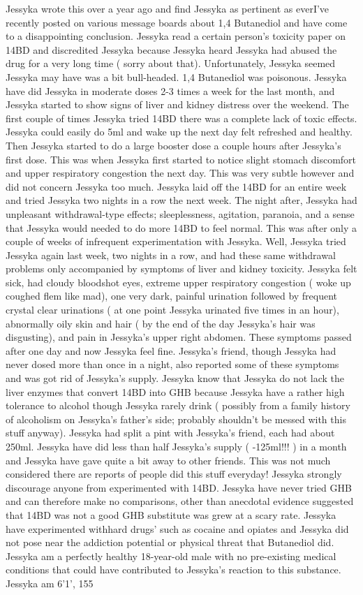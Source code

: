 \documentclass[12pt]{book}
\begin{document}
Jessyka wrote this over a year ago and find Jessyka as pertinent as everI've recently posted on various message boards about 1,4 Butanediol and have come to a disappointing conclusion. Jessyka read a certain person's toxicity paper on 14BD and discredited Jessyka because Jessyka heard Jessyka had abused the drug for a very long time ( sorry about that). Unfortunately, Jessyka seemed Jessyka may have was a bit bull-headed. 1,4 Butanediol was poisonous. Jessyka have did Jessyka in moderate doses 2-3 times a week for the last month, and Jessyka started to show signs of liver and kidney distress over the weekend. The first couple of times Jessyka tried 14BD there was a complete lack of toxic effects. Jessyka could easily do 5ml and wake up the next day felt refreshed and healthy. Then Jessyka started to do a large booster dose a couple hours after Jessyka's first dose. This was when Jessyka first started to notice slight stomach discomfort and upper respiratory congestion the next day. This was very subtle however and did not concern Jessyka too much. Jessyka laid off the 14BD for an entire week and tried Jessyka two nights in a row the next week. The night after, Jessyka had unpleasant withdrawal-type effects; sleeplessness, agitation, paranoia, and a sense that Jessyka would needed to do more 14BD to feel normal. This was after only a couple of weeks of infrequent experimentation with Jessyka. Well, Jessyka tried Jessyka again last week, two nights in a row, and had these same withdrawal problems only accompanied by symptoms of liver and kidney toxicity. Jessyka felt sick, had cloudy bloodshot eyes, extreme upper respiratory congestion ( woke up coughed flem like mad), one very dark, painful urination followed by frequent crystal clear urinations ( at one point Jessyka urinated five times in an hour), abnormally oily skin and hair ( by the end of the day Jessyka's hair was disgusting), and pain in Jessyka's upper right abdomen. These symptoms passed after one day and now Jessyka feel fine. Jessyka's friend, though Jessyka had never dosed more than once in a night, also reported some of these symptoms and was got rid of Jessyka's supply. Jessyka know that Jessyka do not lack the liver enzymes that convert 14BD into GHB because Jessyka have a rather high tolerance to alcohol though Jessyka rarely drink ( possibly from a family history of alcoholism on Jessyka's father's side; probably shouldn't be messed with this stuff anyway). Jessyka had split a pint with Jessyka's friend, each had about 250ml. Jessyka have did less than half Jessyka's supply ( -125ml!!! ) in a month and Jessyka have gave quite a bit away to other friends. This was not much considered there are reports of people did this stuff everyday! Jessyka strongly discourage anyone from experimented with 14BD. Jessyka have never tried GHB and can therefore make no comparisons, other than anecdotal evidence suggested that 14BD was not a good GHB substitute was grew at a scary rate. Jessyka have experimented withhard drugs' such as cocaine and opiates and Jessyka did not pose near the addiction potential or physical threat that Butanediol did. Jessyka am a perfectly healthy 18-year-old male with no pre-existing medical conditions that could have contributed to Jessyka's reaction to this substance. Jessyka am 6'1', 155 
\end{document}
